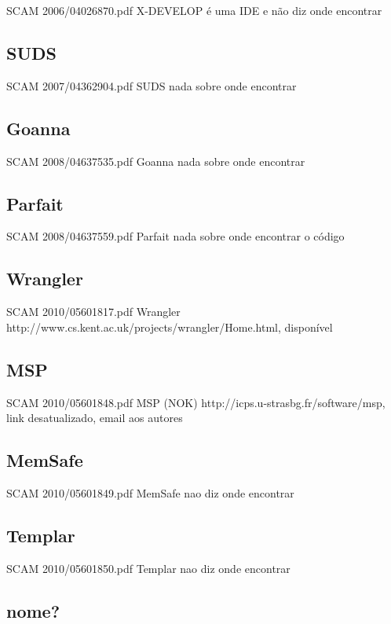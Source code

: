 SCAM 2006/04026870.pdf X-DEVELOP
 é uma IDE e não diz onde encontrar

\subsection{SUDS}

SCAM 2007/04362904.pdf SUDS
 nada sobre onde encontrar

\subsection{Goanna}

SCAM 2008/04637535.pdf Goanna
 nada sobre onde encontrar

\subsection{Parfait}

SCAM 2008/04637559.pdf Parfait
 nada sobre onde encontrar o código

\subsection{Wrangler}

SCAM 2010/05601817.pdf Wrangler
 http://www.cs.kent.ac.uk/projects/wrangler/Home.html, disponível

\subsection{MSP}

SCAM 2010/05601848.pdf MSP (NOK)
 http://icps.u-strasbg.fr/software/msp, link desatualizado, email aos autores

\subsection{MemSafe}

SCAM 2010/05601849.pdf MemSafe
 nao diz onde encontrar

\subsection{Templar}

SCAM 2010/05601850.pdf Templar
 nao diz onde encontrar

\subsection{nome?}

